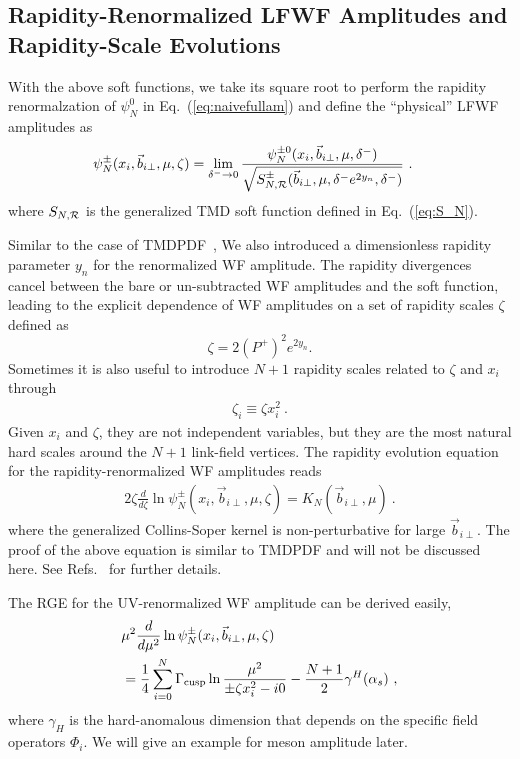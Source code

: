 \documentclass[twocolumn,superscriptaddress,longbibliography,10pt]{revtex4-1}
\begin{document}
\subsection{Rapidity-Renormalized LFWF Amplitudes and Rapidity-Scale Evolutions}

With the above soft functions, we take its square root to perform the rapidity renormalzation of $\psi^0_N$ in Eq.~(\ref{eq:naivefullam}) and define the ``physical'' LFWF amplitudes as
\begin{align}\label{eq:physicalWF}
&\psi^{\pm}_N(x_i,\vec{b}_{i\perp},\mu,\zeta)=\lim_{\delta^- \rightarrow 0}\frac{\psi^{\pm 0}_N(x_i,\vec{b}_{i\perp},\mu,\delta^-)}{\sqrt{S^{\pm}_{N,{\cal R}}(\vec{b}_{i\perp},\mu,\delta^-e^{2y_n},\delta^-)}} \ .
\end{align}
where $S_{N,{\cal R}}$ is the generalized TMD soft function defined in Eq.~(\ref{eq:S_N}).

Similar to the case of TMDPDF~\cite{Collins:2011zzd}, We also introduced a dimensionless rapidity parameter $y_n$ for the renormalized WF amplitude. The rapidity divergences cancel between the bare or un-subtracted WF amplitudes and the soft function, leading to the explicit dependence of WF amplitudes on a set of rapidity scales $\zeta$ defined as
\begin{equation}
\zeta=2(P^+)^2 e^{2y_n} .
\end{equation}
Sometimes it is also useful to introduce  $N+1$ rapidity scales related to $\zeta$ and $x_i$ through
\begin{align}
    \zeta_i\equiv\zeta x_i^2 \ .
\end{align}
Given $x_i$ and $\zeta$, they are not independent variables, but they are the most natural hard scales around the $N+1$ link-field vertices.
The rapidity evolution equation for the rapidity-renormalized WF amplitudes reads
\begin{align}
2\zeta \frac{d}{d\zeta} \ln \psi^{\pm}_N(x_i,\vec{b}_{i\perp},\mu,\zeta)=K_N(\vec{b}_{i\perp},\mu) \ .
\label{eq:kn}
\end{align}
where the generalized Collins-Soper kernel is non-perturbative
for large $\vec{b}_{i\perp}$. The proof of the above
equation is similar to TMDPDF and will not be discussed here. See Refs.~\cite{Collins:1981uk,Ji:2014hxa} for further details.

The RGE for the UV-renormalized WF amplitude can be derived easily,
\begin{align}
&\mu^2\frac{d}{d\mu^2}\ln \psi^{\pm}_N(x_i,\vec{b}_{i\perp},\mu,\zeta)\nonumber \\
&=\frac{1}{4}\sum_{i=0}^{N}\Gamma_{\rm cusp}\ln \frac{\mu^2}{\pm \zeta x_i^2-i0}-\frac{N+1}{2}\gamma^{H}(\alpha_s)  \ ,
\end{align}
where $\gamma_H$ is the hard-anomalous dimension that depends on the specific field operators $\Phi_i$. We will give an example for meson amplitude later.
\end{document}
